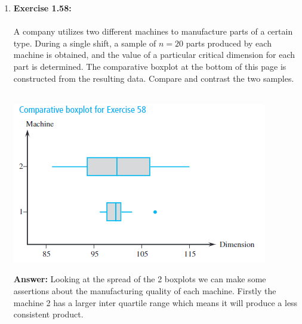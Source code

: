 \documentclass[12pt]{article}
\theoremstyle{homework}
\begin{document}
\begin{enumerate}
\item\hspace{.5in}\textbf{Exercise 1.58:}\\
\\
 A company utilizes two different machines to manufacture parts of a certain type. During a single shift, a sample of $n=20$ parts produced by each machine is obtained, and the value of a particular critical dimension for each part is determined. The comparative boxplot at the bottom of this page is constructed from the resulting data. Compare and contrast the two samples.\\
 \\
 \begin{center}
  \includegraphics[width = .66\textwidth]{boxplot.png}  
 \end{center}
 

 \textbf{Answer:} Looking at the spread of the 2 boxplots we can make some assertions about the manufacturing quality of each machine.
 Firstly the machine 2 has a larger inter quartile range which means it will produce a less consistent product. 
\vspace{1in}






\end{enumerate}
\end{document}
